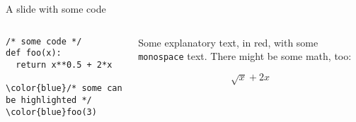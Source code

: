 \begin{frame}[fragile]{A slide with some code}

    \begin{columns}
        \begin{column}{0.5\linewidth}
            \footnotesize
            \begin{Verbatim}[commandchars=\\\{\}]
/* some code */
def foo(x):
  return x**0.5 + 2*x

\color{blue}/* some can be highlighted */
\color{blue}foo(3)
      \end{Verbatim}
    \end{column}
    \begin{column}{0.5\linewidth}
      {\color{red} Some explanatory text, in red, with some \texttt{monospace} text.}
      There might be some math, too:

      $$\sqrt{x} + 2x$$
    \end{column}
  \end{columns}

\end{frame}
